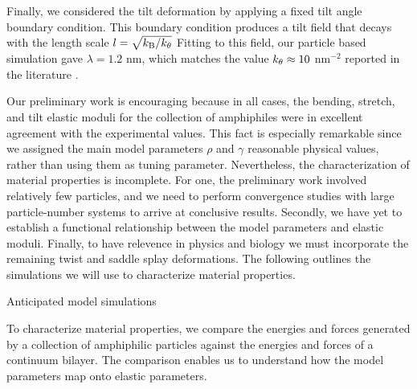 Finally, we considered the tilt deformation by applying a fixed tilt angle boundary condition. 
This boundary condition produces a tilt field that decays with the length scale $l = \sqrt{k_{\mathrm{B}}/k_{\theta}}$ 
Fitting to this field, our particle based simulation gave $\lambda = 1.2$ nm, which matches
the value $k_{\theta} \approx 10$ \kBT \; nm$^{-2}$ reported in the literature \cite{https://doi.org/10.1063/1.4932971}.

Our preliminary work is encouraging because in all cases, the bending, stretch, and tilt elastic moduli for the collection of amphiphiles
were in excellent agreement with the experimental values. This fact is especially remarkable 
since we assigned the main model parameters $\rho$ and $\gamma$ reasonable physical values, rather than using them as tuning parameter. 
Nevertheless, the characterization of material properties is incomplete. For one, the preliminary work involved relatively few particles, and we need to
perform convergence studies with large particle-number systems to arrive at conclusive results. Secondly, we have yet to establish a functional
relationship between the model parameters and elastic moduli. Finally, to have relevence in physics and biology
we must incorporate the remaining twist and saddle splay deformations.
The following outlines the simulations we will use to characterize material properties. 



\begin{center}
Anticipated model simulations
\end{center}
To characterize material properties, we compare the energies and forces generated by
a collection of amphiphilic particles against the energies and forces of a continuum bilayer.
The comparison enables us to understand how the model parameters map onto elastic parameters. 

